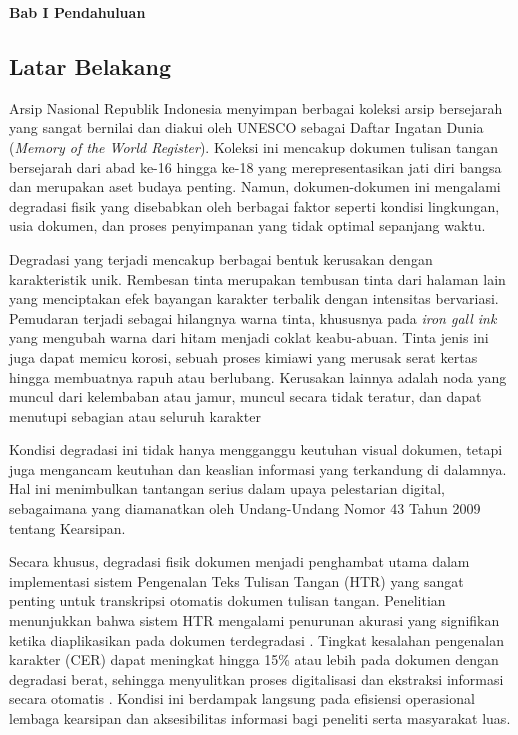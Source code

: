 \documentclass[12pt,a4paper]{article}
\begin{document}

\vspace{2cm}
\begin{center}
      {\fontsize{14}{16.8}\selectfont\textbf{Bab I \quad Pendahuluan}}
\end{center}
\label{sec:pendahuluan}
\setcounter{section}{1}
\setcounter{subsection}{0}
\subsection{Latar Belakang}
\label{subsec:latar-belakang}

Arsip Nasional Republik Indonesia menyimpan berbagai koleksi arsip bersejarah yang sangat bernilai dan diakui oleh UNESCO sebagai Daftar Ingatan Dunia (\textit{Memory of the World Register}). Koleksi ini mencakup dokumen tulisan tangan bersejarah dari abad ke-16 hingga ke-18 yang merepresentasikan jati diri bangsa dan merupakan aset budaya penting. Namun, dokumen-dokumen ini mengalami degradasi fisik yang disebabkan oleh berbagai faktor seperti kondisi lingkungan, usia dokumen, dan proses penyimpanan yang tidak optimal sepanjang waktu.



Degradasi yang terjadi mencakup berbagai bentuk kerusakan dengan karakteristik unik. Rembesan tinta merupakan tembusan tinta dari halaman lain yang menciptakan efek bayangan karakter terbalik dengan intensitas bervariasi. Pemudaran terjadi sebagai hilangnya warna tinta, khususnya pada \textit{iron gall ink} yang mengubah warna dari hitam menjadi coklat keabu-abuan. Tinta jenis ini juga dapat memicu korosi, sebuah proses kimiawi yang merusak serat kertas hingga membuatnya rapuh atau berlubang. Kerusakan lainnya adalah noda yang muncul dari kelembaban atau jamur, muncul secara tidak teratur, dan dapat menutupi sebagian atau seluruh karakter


Kondisi degradasi ini tidak hanya mengganggu keutuhan visual dokumen, tetapi juga mengancam keutuhan dan keaslian informasi yang terkandung di dalamnya. Hal ini menimbulkan tantangan serius dalam upaya pelestarian digital, sebagaimana yang diamanatkan oleh Undang-Undang Nomor 43 Tahun 2009 tentang Kearsipan.


Secara khusus, degradasi fisik dokumen menjadi penghambat utama dalam implementasi sistem Pengenalan Teks Tulisan Tangan (HTR) yang sangat penting untuk transkripsi otomatis dokumen tulisan tangan. Penelitian menunjukkan bahwa sistem HTR mengalami penurunan akurasi yang signifikan ketika diaplikasikan pada dokumen terdegradasi \parencite{gatos2006}. Tingkat kesalahan pengenalan karakter (CER) dapat meningkat hingga 15\% atau lebih pada dokumen dengan degradasi berat, sehingga menyulitkan proses digitalisasi dan ekstraksi informasi secara otomatis \parencite{jadhav2022}. Kondisi ini berdampak langsung pada efisiensi operasional lembaga kearsipan dan aksesibilitas informasi bagi peneliti serta masyarakat luas.
\end{document}
